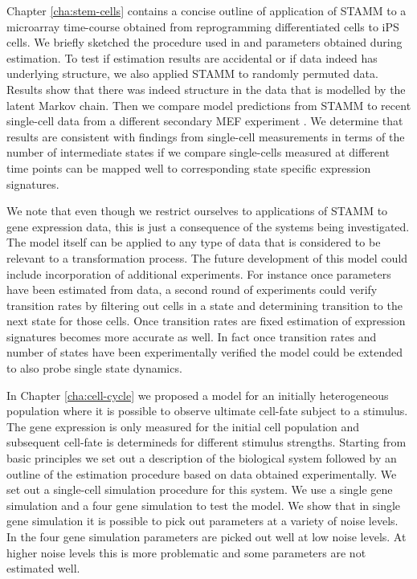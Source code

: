Chapter \ref{cha:stem-cells} contains a concise outline of application of STAMM to a microarray time-course obtained from reprogramming differentiated cells to iPS cells. We briefly sketched the procedure used in \cite{Armond:2013} and parameters obtained during estimation. To test if estimation results are accidental or if data indeed has underlying structure, we also applied STAMM to randomly permuted data. Results show that there was indeed structure in the data that is modelled by the latent Markov chain. Then we compare model predictions from STAMM to recent single-cell data from a different secondary MEF experiment \citep{Buganim:2012hp}. We determine that results are consistent with findings from single-cell measurements in terms of the number of intermediate states if we compare single-cells measured at different time points can be mapped well to corresponding state specific expression signatures.

We note that even though we restrict ourselves to applications of STAMM to gene expression data, this is just a consequence of the systems being investigated. The model itself can be applied to any type of data that is considered to be relevant to a transformation process. The future development of this model could include incorporation of additional experiments. For instance once parameters have been estimated from data, a second round of experiments could verify transition rates by filtering out cells in a state and determining transition to the next state for those cells. Once transition rates are fixed estimation of expression signatures becomes more accurate as well. In fact once transition rates and number of states have been experimentally verified the model could be extended to also probe single state dynamics. 

In Chapter \ref{cha:cell-cycle} we proposed a model for an initially heterogeneous population where it is possible to observe ultimate cell-fate subject to a stimulus. The gene expression is only measured for the initial cell population and subsequent cell-fate is determineds for different stimulus strengths. Starting from basic principles we set out a description of the biological system followed by an outline of the estimation procedure based on data obtained experimentally. We set out a single-cell simulation procedure for this system. We use a single gene simulation and a four gene simulation to test the model. We show that in single gene simulation it is possible to pick out parameters at a variety of noise levels. In the four gene simulation parameters are picked out well at low noise levels. At higher noise levels this is more problematic and some parameters are not estimated well. 

